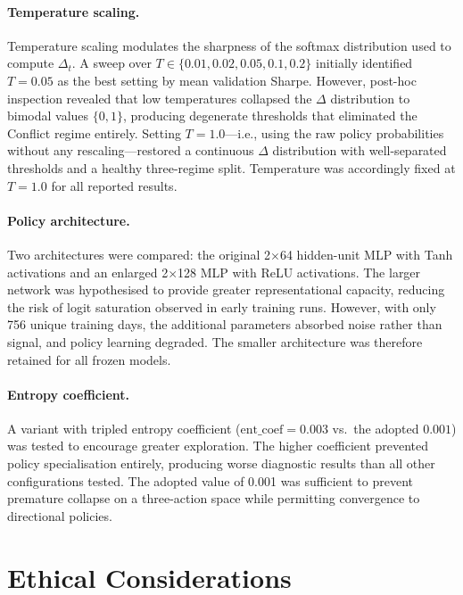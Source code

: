 \paragraph{Temperature scaling.}
Temperature scaling modulates the sharpness of the softmax distribution used to compute $\Delta_t$. A sweep over $T \in \{0.01, 0.02, 0.05, 0.1, 0.2\}$ initially identified $T = 0.05$ as the best setting by mean validation Sharpe. However, post-hoc inspection revealed that low temperatures collapsed the $\Delta$ distribution to bimodal values $\{0, 1\}$, producing degenerate thresholds that eliminated the Conflict regime entirely. Setting $T = 1.0$---i.e., using the raw policy probabilities without any rescaling---restored a continuous $\Delta$ distribution with well-separated thresholds and a healthy three-regime split. Temperature was accordingly fixed at $T = 1.0$ for all reported results.

\paragraph{Policy architecture.}
Two architectures were compared: the original 2$\times$64 hidden-unit MLP with Tanh activations and an enlarged 2$\times$128 MLP with ReLU activations. The larger network was hypothesised to provide greater representational capacity, reducing the risk of logit saturation observed in early training runs. However, with only 756 unique training days, the additional parameters absorbed noise rather than signal, and policy learning degraded. The smaller architecture was therefore retained for all frozen models.

\paragraph{Entropy coefficient.}
A variant with tripled entropy coefficient ($\mathrm{ent\_coef} = 0.003$ vs.\ the adopted $0.001$) was tested to encourage greater exploration. The higher coefficient prevented policy specialisation entirely, producing worse diagnostic results than all other configurations tested. The adopted value of 0.001 was sufficient to prevent premature collapse on a three-action space while permitting convergence to directional policies.

\section{Ethical Considerations}
\label{sec:ethics}

